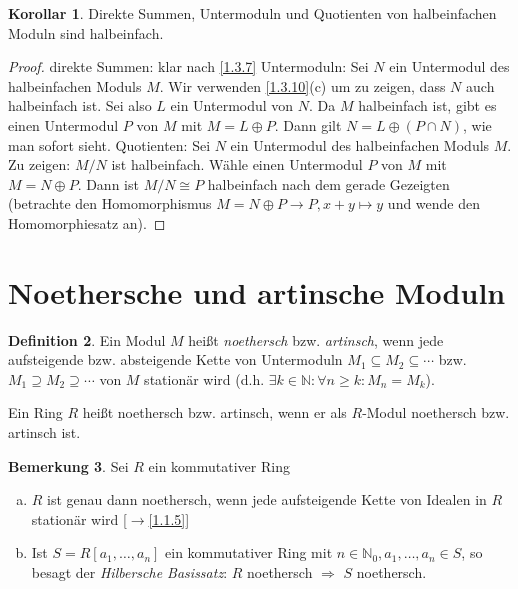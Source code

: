 \documentclass[
twoside=semi,
fontsize=12,
DIV=12, 
cleardoublepage=current,
leqno,
headings=optiontoheadandtoc, 
toc=idx
]{scrbook}
\newcommand{\N}{\mathbb{N}}
\theoremstyle{definition}
\newtheorem{definition}{Definition}[section]
\newtheorem{bemerkung}[definition]{Bemerkung}
\newtheorem{korollar}[definition]{Korollar}
\begin{document}
	\begin{korollar}\label{1.3.11}\hfill\newline
		Direkte Summen, Untermoduln und Quotienten von halbeinfachen Moduln sind halbeinfach.
		
		\begin{proof}
			direkte Summen: klar nach \ref{1.3.7}\newline
			Untermoduln: Sei $N$ ein Untermodul des halbeinfachen Moduls $M$. Wir verwenden \ref{1.3.10}(c) um zu zeigen, dass $N$ auch halbeinfach ist. Sei also $L$ ein Untermodul von $N$. Da $M$ halbeinfach ist, gibt es einen Untermodul $P$ von $M$ mit $M = L \oplus P$. Dann gilt $N = L \oplus (P \cap N)$, wie man sofort sieht.\newline
			Quotienten: Sei $N$ ein Untermodul des halbeinfachen Moduls $M$. Zu zeigen: $M/N$ ist halbeinfach.\newline
			W\"ahle einen Untermodul $P$ von $M$ mit $M = N \oplus P$. Dann ist $M/N \cong P$ halbeinfach nach dem gerade Gezeigten (betrachte den Homomorphismus $M = N \oplus P \to P, x+y \mapsto y$ und wende den Homomorphiesatz an).
		\end{proof}
	\end{korollar}
	\newpage
	
	\section{Noethersche und artinsche Moduln}
	\begin{definition}\label{1.4.1}
		Ein Modul $M$ hei\ss t \emph{noethersch} bzw. \emph{artinsch}, wenn jede aufsteigende bzw. absteigende Kette von Untermoduln $M_1 \subseteq M_2 \subseteq \cdots$ bzw. $M_1 \supseteq M_2 \supseteq \cdots$ von $M$ station\"ar wird (d.h. $\exists k \in \N: \forall n \geq k: M_n = M_k$).
		
		\noindent Ein Ring $R$ hei\ss t noethersch bzw. artinsch, wenn er als $R$-Modul noethersch bzw. artinsch ist.
	\end{definition}

	\begin{bemerkung}\label{1.4.2}
		Sei $R$ ein kommutativer Ring
		
		\begin{enumerate}[(a)]
			\item $R$ ist genau dann noethersch, wenn jede aufsteigende Kette von Idealen in $R$ station\"ar wird [$\to$\ref{1.1.5}]
			
			\item Ist $S = R[a_1, \dots, a_n]$ ein kommutativer Ring mit $n \in \N_0, a_1, \dots, a_n \in S$, so besagt der \emph{Hilbersche Basissatz}:
				$R$ noethersch $\Rightarrow$ $S$ noethersch.
		\end{enumerate}
	\end{bemerkung}
\end{document}

